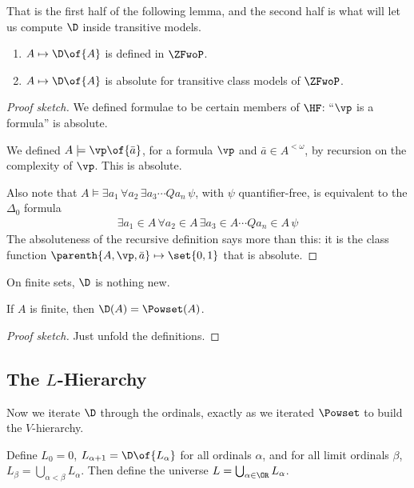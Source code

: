 That is the first half of the following lemma, and the second half is what will let us compute $\D$ inside transitive models.

\begin{boxlemma} \label{Ch3:Lemma:D_Absolute} \hfill
    \begin{enumerate}
        \item $A \mapsto \D\of{A}$ is defined in $\ZFwoP$.
        \item $A \mapsto \D\of{A}$ is absolute for transitive class models of $\ZFwoP$.
    \end{enumerate}
\end{boxlemma}
\begin{proof}[Proof sketch]
    We defined formulae to be certain members of $\HF$: ``$\vp$ is a formula'' is absolute.

    We defined $A \models \vp\of{\bar{a}}$, for a formula $\vp$ and $\bar{a} \in A^{<\omega}$, by recursion on the complexity of $\vp$. This is absolute.

    Also note that $A \models \exists a_1 \, \forall a_2 \, \exists a_3 \cdots Q a_n \, \psi$, with $\psi$ quantifier-free, is equivalent to the $\Delta_0$ formula
    \begin{align*}
        \exists a_1 \in A \, \forall a_2 \in A \, \exists a_3 \in A \cdots Q a_n \in A \, \psi
    \end{align*}
    The absoluteness of the recursive definition says more than this: it is the class function $\parenth{A, \vp, \bar{a}} \mapsto \set{0, 1}$ that is absolute.
\end{proof}

On finite sets, $\D$ is nothing new.

\begin{boxlemma}
    If $A$ is finite, then $\D(A) = \Powset(A)$.
\end{boxlemma}
\begin{proof}[Proof sketch]
    Just unfold the definitions.
\end{proof}

\subsection{The $L$-Hierarchy}

Now we iterate $\D$ through the ordinals, exactly as we iterated $\Powset$ to build the $V$-hierarchy.

\begin{boxdefinition}
    Define $L_0 = 0$, $L_{\alpha + 1} = \D\of{L_{\alpha}}$ for all ordinals $\alpha$, and for all limit ordinals $\beta$, $L_{\beta} = \bigcup_{\alpha < \beta} L_{\alpha}$. Then define the universe $L = \bigcup_{\alpha \in \OR} L_{\alpha}$.
\end{boxdefinition}


